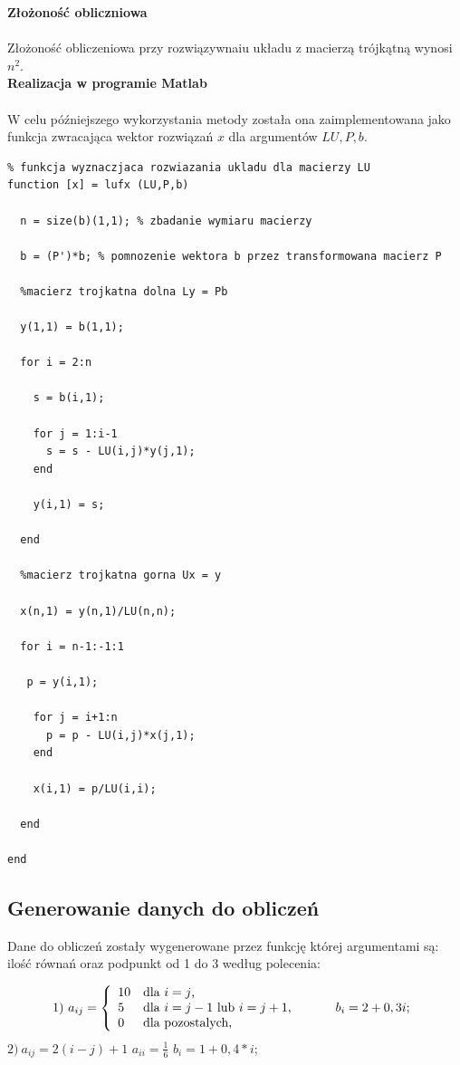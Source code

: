 \documentclass[a4paper, 11pt]{article}
\begin{document}
\textbf{Złożoność obliczniowa}\\
\\
Złożoność obliczeniowa przy rozwiązywnaiu układu z macierzą trójkątną wynosi $n^2$.\\

\textbf{Realizacja w programie Matlab}\\
\\
W celu późniejszego wykorzystania metody została ona zaimplementowana jako funkcja zwracająca wektor rozwiązań $x$ dla argumentów $LU,P,b$.

\begin{lstlisting}
% funkcja wyznaczjaca rozwiazania ukladu dla macierzy LU
function [x] = lufx (LU,P,b)

  n = size(b)(1,1); % zbadanie wymiaru macierzy

  b = (P')*b; % pomnozenie wektora b przez transformowana macierz P

  %macierz trojkatna dolna Ly = Pb

  y(1,1) = b(1,1);

  for i = 2:n

    s = b(i,1);
  
    for j = 1:i-1
      s = s - LU(i,j)*y(j,1);
    end
  
    y(i,1) = s;
  
  end

  %macierz trojkatna gorna Ux = y

  x(n,1) = y(n,1)/LU(n,n);

  for i = n-1:-1:1

   p = y(i,1);
  
    for j = i+1:n
      p = p - LU(i,j)*x(j,1);
    end
  
    x(i,1) = p/LU(i,i);
  
  end

end

\end{lstlisting}

\subsection{Generowanie danych do obliczeń}
Dane do obliczeń zostały wygenerowane przez funkcję której argumentami są: ilość równań oraz podpunkt od 1 do 3 według polecenia:

$$
1) \ a_{ij} = \left\{ \begin{array}{ll}
10 & \textrm{dla $i=j$,}\\
5 & \textrm{dla $i=j-1$ lub $i=j+1$, \hspace{1cm} $b_{i} = 2+0,3i$;}\\
0 & \textrm{dla pozostalych,}
\end{array} \right.
$$
\hspace{3cm} $2) \ a_{ij} = 2(i-j)+1$ \hspace{1cm} $a_{ii} = \frac{1}{6}$ \hspace{1cm} $b_{i} =1+0,4*i$; \\
\end{document}
